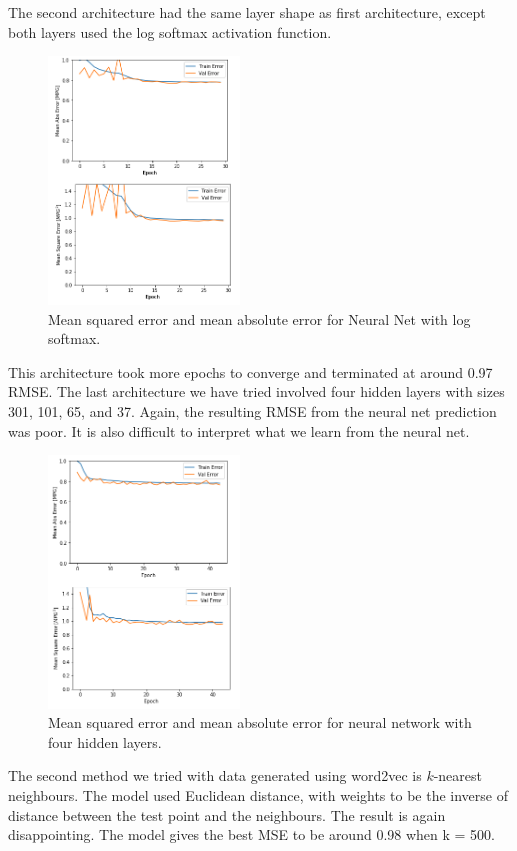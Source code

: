 \documentclass{sig-alternate-05-2015}
\begin{document}
The second architecture had the same layer shape as first architecture, except both layers used the log softmax activation function.
\begin{figure}
    \begin{center}
        \includegraphics[width=2in]{NNSoftmax.png}
        \caption{Mean squared error and mean absolute error for Neural Net with log softmax.}
        \label{neuralnetlog}
    \end{center}
\end{figure}
This architecture took more epochs to converge and terminated at around 0.97 RMSE.
The last architecture we have tried involved four hidden layers with sizes 301, 101, 65, and 37. Again, the resulting
RMSE from the neural net prediction was poor. It is also difficult to interpret what we learn from the neural net.

\begin{figure}
    \begin{center}
        \includegraphics[width=2in]{NNComplex.png}
        \caption{Mean squared error and mean absolute error for neural network with four hidden layers.}
        \label{neuralnetcomplex}
    \end{center}
\end{figure}
The second method we tried with data generated using word2vec is \(k\)-nearest neighbours. The model used
Euclidean distance, with weights to be the inverse of distance between the test point and the neighbours.
The result is again disappointing. The model gives the best MSE to be around 0.98 when k = 500.
\end{document}
